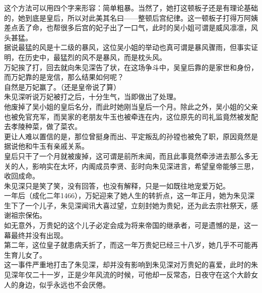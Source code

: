 \begin{multicols}{\theparacolNo}
这个方法可以用四个字来形容：简单粗暴。当然了，她打这顿板子还是有理论基础的，她到底是皇后，所以对此美其名曰——整顿后宫纪律。这一顿板子打得万阿姨差点丢了命，也帮很多后宫的妃子出了一口气，此时的吴小姐可谓是威风凛凛，风头甚猛。\\

据说最猛的风是十二级的暴风，这位吴小姐的举动也真可谓是暴风骤雨，但事实证明，在历史中，最猛烈的风不是暴风，而是枕头风。\\

万妃挨了打，回去就向朱见深告了状，在这场争斗中，吴皇后靠的是家世和身份，而万妃靠的是宠信，那么结果如何呢？\\

自然是万妃赢了。（还是皇帝说了算）\\

朱见深听说万妃被打之后，十分生气，当即做出了处理。\\

他废掉了吴小姐的皇后名分，而此时她刚当皇后一个月。除此之外，吴小姐的父亲也被免官充军，而吴家的老朋友牛玉也被牵连在内，这位原先的司礼监竟然被发配去孝陵种菜，做了菜农。\\

更让人难以置信的是，那位曾挺身而出、平定叛乱的孙镗也被免了职，原因竟然是据说他和牛玉有亲戚关系。\\

皇后只干了一个月就被废掉，这可谓是前所未闻，而且此事竟然牵涉进去那么多无关的人，影响实在太坏，内阁成员李贤、彭时向朱见深进言，希望皇帝能够三思，收回成命。\\

朱见深只是笑了笑，没有回答，也没有解释，只是一如既往地宠爱万妃。\\

一年后（成化二年1466），万妃迎来了她人生的转折点，这一年正月，她为朱见深生下了一个儿子，朱见深闻讯大喜过望，立刻封她为贵妃，还为此去宗社祭天，感谢祖宗保佑。\\

如无意外，万贵妃的这个儿子必定会成为将来帝国的继承者，可是遗憾的是，这一幕最终并没有出现。\\

第二年，这位皇子就患病夭折了，而这一年万贵妃已经三十八岁，她几乎不可能再生育儿女了。\\

这一事件严重地打击了朱见深，却并没有影响到朱见深对万贵妃的喜爱，此时的朱见深年仅二十一岁，正是少年风流的时候，可他却一反常态，日夜守在这个大龄女人的身边，似乎永远也不会厌倦。\\


\end{multicols}
